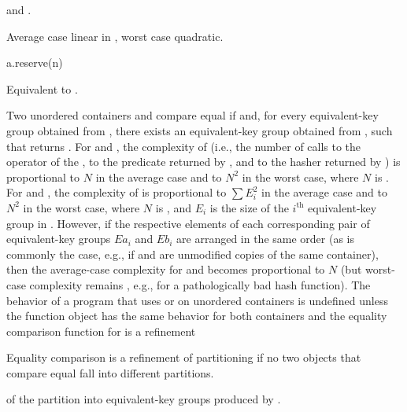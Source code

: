 \begin{itemdescr}
\pnum
\result
{}

\pnum
\ensures
{} and
.%

\pnum
\complexity
Average case linear in , worst case quadratic.
\end{itemdescr}

%
\begin{itemdecl}
a.reserve(n)
\end{itemdecl}

\begin{itemdescr}
\pnum
\effects
Equivalent to .
\end{itemdescr}

\pnum
Two unordered containers  and  compare equal if
 and, for every equivalent-key group
 obtained from , there exists an
equivalent-key group  obtained from ,
such that
 returns . For
 and , the complexity of
 (i.e., the number of calls to the \tcode{==} operator
of the , to the predicate returned by ,
and to the hasher returned by ) is proportional to
$N$ in the average case and to $N^2$ in the worst case, where $N$ is
. For  and ,
the complexity of  is proportional to $\sum E_i^2$
in the average case and to $N^2$ in the worst case, where $N$ is ,
and $E_i$ is the size of the $i^\text{th}$ equivalent-key group in .
However, if the respective elements of each corresponding pair of
equivalent-key groups $Ea_i$ and $Eb_i$ are arranged in the same order
(as is commonly the case, e.g., if  and  are unmodified copies
of the same container), then the average-case complexity for
 and  becomes
proportional to $N$ (but worst-case complexity remains , e.g., for
a pathologically bad hash function). The behavior of a program that uses
 or  on unordered containers is undefined
unless the  function object has
the same behavior for both containers and the equality comparison function
for  is a refinement
\begin{footnote}
Equality comparison is a refinement
of partitioning if no two objects that
compare equal fall into different partitions.
\end{footnote}
of the partition into equivalent-key groups produced by .

